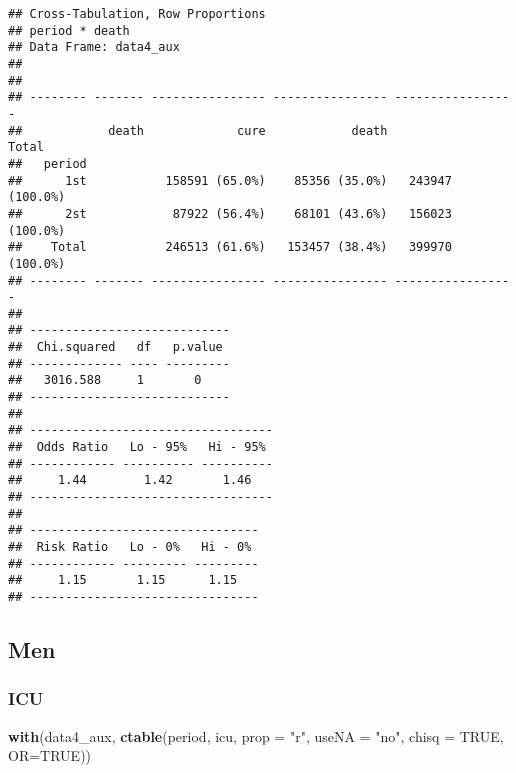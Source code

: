 \documentclass[
]{article}
\newenvironment{Shaded}{\begin{snugshade}}{\end{snugshade}}
\newcommand{\DataTypeTok}[1]{\textcolor[rgb]{0.13,0.29,0.53}{#1}}
\newcommand{\KeywordTok}[1]{\textcolor[rgb]{0.13,0.29,0.53}{\textbf{#1}}}
\newcommand{\NormalTok}[1]{#1}
\newcommand{\OperatorTok}[1]{\textcolor[rgb]{0.81,0.36,0.00}{\textbf{#1}}}
\newcommand{\OtherTok}[1]{\textcolor[rgb]{0.56,0.35,0.01}{#1}}
\newcommand{\StringTok}[1]{\textcolor[rgb]{0.31,0.60,0.02}{#1}}
\begin{document}
\begin{verbatim}
## Cross-Tabulation, Row Proportions  
## period * death  
## Data Frame: data4_aux  
## 
## 
## -------- ------- ---------------- ---------------- -----------------
##            death             cure            death             Total
##   period                                                            
##      1st           158591 (65.0%)    85356 (35.0%)   243947 (100.0%)
##      2st            87922 (56.4%)    68101 (43.6%)   156023 (100.0%)
##    Total           246513 (61.6%)   153457 (38.4%)   399970 (100.0%)
## -------- ------- ---------------- ---------------- -----------------
## 
## ----------------------------
##  Chi.squared   df   p.value 
## ------------- ---- ---------
##   3016.588     1       0    
## ----------------------------
## 
## ----------------------------------
##  Odds Ratio   Lo - 95%   Hi - 95% 
## ------------ ---------- ----------
##     1.44        1.42       1.46   
## ----------------------------------
## 
## --------------------------------
##  Risk Ratio   Lo - 0%   Hi - 0% 
## ------------ --------- ---------
##     1.15       1.15      1.15   
## --------------------------------
\end{verbatim}

\hypertarget{men-3}{%
\subsection{Men}\label{men-3}}

\begin{Shaded}
\end{Shaded}

\hypertarget{icu-1}{%
\subsubsection{ICU}\label{icu-1}}

\begin{Shaded}
\begin{Highlighting}[]
\KeywordTok{with}\NormalTok{(data4_aux, }\KeywordTok{ctable}\NormalTok{(period, icu, }\DataTypeTok{prop =} \StringTok{"r"}\NormalTok{, }\DataTypeTok{useNA =} \StringTok{"no"}\NormalTok{, }\DataTypeTok{chisq =} \OtherTok{TRUE}\NormalTok{, }\DataTypeTok{OR=}\OtherTok{TRUE}\NormalTok{))}
\end{Highlighting}
\end{Shaded}
\end{document}
